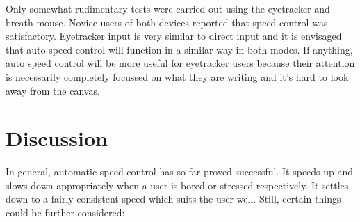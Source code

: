 \documentclass[a4paper,11pt,notitlepage]{article}
\begin{document}
Only somewhat rudimentary tests were carried out using the eyetracker and
breath mouse. Novice users of both devices reported that speed control was
satisfactory. Eyetracker input is very similar to direct input and it is
envisaged that auto-speed control will function in a similar way in both modes.
If anything, auto speed control will be more useful for eyetracker users
because their attention is necessarily completely focussed on what they are
writing and it's hard to look away from the canvas.

\section{Discussion}

In general, automatic speed control has so far proved successful. It
speeds up and slows down appropriately when a user is bored or
stressed respectively. It settles down to a fairly consistent speed
which suits the user well. Still, certain things could be further
considered:
\end{document}
